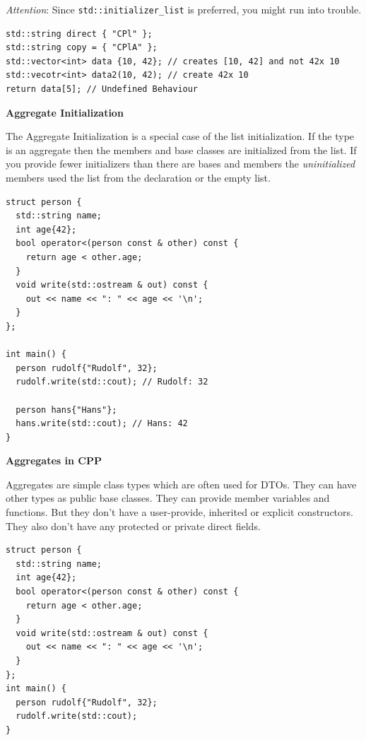 \documentclass[11pt,twoside,landscape]{article}
\begin{document}
\begin{multicols}{3}
\emph{Attention}: Since \texttt{std::initializer\_list} is preferred, you might run into trouble.


\lstset{language=c++,label= ,caption= ,captionpos=b,numbers=none}
\begin{lstlisting}
std::string direct { "CPl" };
std::string copy = { "CPlA" };
std::vector<int> data {10, 42}; // creates [10, 42] and not 42x 10
std::vecotr<int> data2(10, 42); // create 42x 10
return data[5]; // Undefined Behaviour
\end{lstlisting}

\textbf{Aggregate Initialization}

The Aggregate Initialization is a special case of the list initialization.
If the type is an aggregate then the members and base classes are initialized from the list.
If you provide fewer initializers than there are bases and members the \emph{uninitialized} members used the list from the declaration or the empty list.

\lstset{language=c++,label= ,caption= ,captionpos=b,numbers=none}
\begin{lstlisting}
struct person {
  std::string name;
  int age{42};
  bool operator<(person const & other) const {
    return age < other.age;
  }
  void write(std::ostream & out) const {
    out << name << ": " << age << '\n';
  }
};

int main() {
  person rudolf{"Rudolf", 32};
  rudolf.write(std::cout); // Rudolf: 32

  person hans{"Hans"};
  hans.write(std::cout); // Hans: 42
}
\end{lstlisting}

\textbf{Aggregates in CPP}

Aggregates are simple class types which are often used for DTOs.
They can have other types as public base classes.
They can provide member variables and functions.
But they don't have a user-provide, inherited or explicit constructors.
They also don't have any protected or private direct fields.


\lstset{language=c++,label= ,caption= ,captionpos=b,numbers=none}
\begin{lstlisting}
struct person {
  std::string name;
  int age{42};
  bool operator<(person const & other) const {
    return age < other.age;
  }
  void write(std::ostream & out) const {
    out << name << ": " << age << '\n';
  }
};
int main() {
  person rudolf{"Rudolf", 32};
  rudolf.write(std::cout);
}
\end{lstlisting}


\end{multicols}
\end{document}
